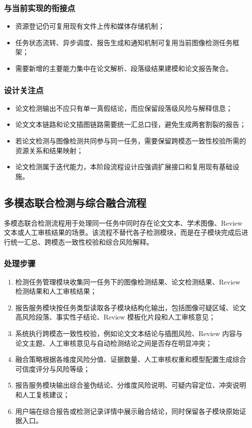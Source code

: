 \subsubsection{与当前实现的衔接点}
\begin{itemize}[leftmargin=2em]
    \item 资源登记仍可复用现有文件上传和媒体存储机制；
    \item 任务状态流转、异步调度、报告生成和通知机制可复用当前图像检测任务框架；
    \item 需要新增的主要能力集中在论文解析、段落级结果建模和论文报告聚合。
\end{itemize}

\subsubsection{设计关注点}
\begin{itemize}[leftmargin=2em]
    \item 论文检测输出不应只有单一真假结论，而应保留段落级风险与解释信息；
    \item 论文文本链路和论文插图链路需要统一汇总口径，避免生成两套割裂的报告；
    \item 若论文检测与图像检测共同参与同一任务，需要保留跨模态一致性校验所需的资源关系和结果映射；
    \item 论文检测属于迭代能力，本阶段流程设计应强调扩展接口和复用现有基础设施。
\end{itemize}

\subsection{多模态联合检测与综合融合流程}
多模态联合检测流程用于处理同一任务中同时存在论文文本、学术图像、Review 文本或人工审核结果的场景。该流程不替代各子检测模块，而是在子模块完成后进行统一汇总、跨模态一致性校验和综合风险解释。

\subsubsection{处理步骤}
\begin{enumerate}[leftmargin=2em]
    \item 检测任务管理模块收集同一任务下的图像检测结果、论文检测结果、Review 检测结果和人工审核结果；
    \item 报告服务模块按任务类型读取各子模块结构化输出，包括图像可疑区域、论文高风险段落、事实性子结论、Review 模板化片段和人工审核意见；
    \item 系统执行跨模态一致性校验，例如论文文本结论与插图风险、Review 内容与论文主题、人工审核意见与自动检测结论之间是否存在明显冲突；
    \item 融合策略根据各维度风险分值、证据数量、人工审核权重和模型配置生成综合可信度评分与风险等级；
    \item 报告服务模块输出综合鉴伪结论、分维度风险说明、可疑内容定位、冲突说明和人工复核建议；
    \item 用户端在综合报告或检测记录详情中展示融合结论，同时保留各子模块原始证据入口。
\end{enumerate}

